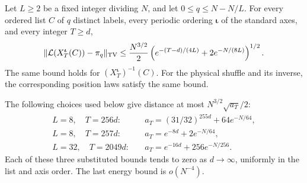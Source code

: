 \begin{proposition}
\label{shear:prop:fixed-marginal}
Let $L\ge2$ be a fixed integer dividing $N$, and let
$0\le q\le N-N/L$. For every ordered list $C$ of $q$ distinct
labels, every periodic ordering $\boldsymbol\iota$ of the standard
axes, and every integer $T\ge d$,
\begin{equation}\label{shear:eq:general-fixed-marginal}
 \|\mathcal L(X^{\boldsymbol\iota}_T(C))-\pi_q\|_{\mathrm{TV}}
 \le\frac{N^{3/2}}2
 \left(e^{-(T-d)/(4L)}+2e^{-N/(8L)}\right)^{1/2}.
\end{equation}
The same bound holds for $(X^{\boldsymbol\iota}_T)^{-1}(C)$.
For the physical shuffle and its inverse, the corresponding
position laws satisfy the same bound.

The following choices used below give distance at most
$N^{3/2}\sqrt{a_T}/2$:
\begin{align}
 L=8,\quad T=256d:&\quad
 a_T=(31/32)^{255d}+64e^{-N/64},
 \label{shear:eq:256-marginal}\\
 L=8,\quad T=257d:&\quad
 a_T=e^{-8d}+2e^{-N/64},
 \label{shear:eq:257-marginal}\\
 L=32,\quad T=2049d:&\quad
 a_T=e^{-16d}+256e^{-N/256}.
 \label{shear:eq:2049-marginal}
\end{align}
Each of these three substituted bounds tends to zero as
$d\to\infty$, uniformly in the list and axis order. The last
energy bound is $o(N^{-4})$.
\end{proposition}
